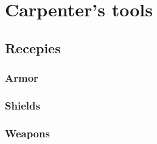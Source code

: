 \chapter{Carpenter's tools}

\section{Recepies}

\subsection{Armor}

\subsection{Shields}

\subsection{Weapons}
